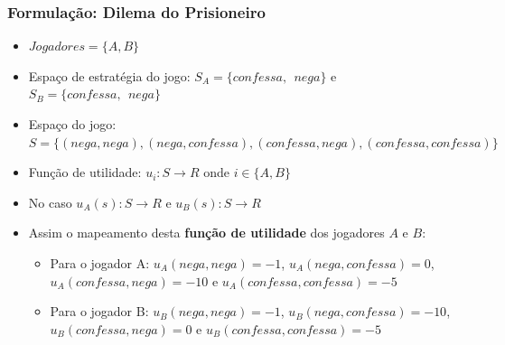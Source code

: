 \begin{frame}
    \frametitle{Formulação: Dilema do Prisioneiro}

\begin{itemize}
  \item $Jogadores = \{A,B\}$
  \item Espaço de estratégia do jogo: $S_A = \{confessa, \:\: nega\}$ e  $S_B = \{confessa, \:\: nega\}$
  \item Espaço do jogo: $S = \{ (nega, nega), (nega,confessa), (confessa, nega), (confessa, confessa) \}$
  \item Função de utilidade: $u_i: S \rightarrow R$ onde $i \in \{A,B\}$
  
  \item No caso $u_A (s): S \rightarrow R$ e $u_B (s): S \rightarrow R$

  \item Assim o mapeamento desta \textbf{função de utilidade} dos jogadores $A$ e $B$:
  
  \begin{itemize}
    \item Para o jogador A:  $u_A (nega, nega) = -1$, $u_A(nega, confessa) = 0$, $u_A(confessa, nega) = -10$  e  $u_A(confessa, confessa) = -5$
  
    \item  Para o jogador B:  $u_B(nega, nega) = -1$, $u_B(nega, confessa) = -10$, $u_B(confessa, nega) = 0$  e  $u_B(confessa, confessa) = -5$
    
  \end{itemize}
  
\end{itemize}


\end{frame}


